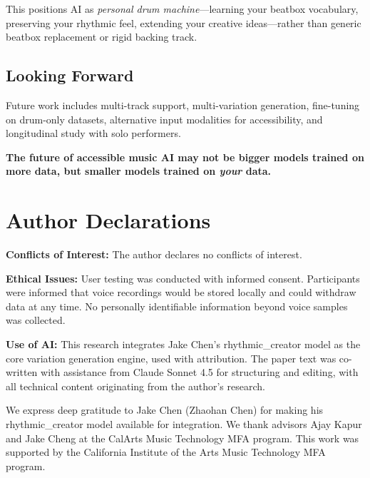 \documentclass{aimc2026}
\begin{document}
This positions AI as \emph{personal drum machine}---learning your beatbox vocabulary, preserving your rhythmic feel, extending your creative ideas---rather than generic beatbox replacement or rigid backing track.

\subsection{Looking Forward}

Future work includes multi-track support, multi-variation generation, fine-tuning on drum-only datasets, alternative input modalities for accessibility, and longitudinal study with solo performers.

\textbf{The future of accessible music AI may not be bigger models trained on more data, but smaller models trained on \emph{your} data.}


\section*{Author Declarations}

\textbf{Conflicts of Interest:} The author declares no conflicts of interest.

\textbf{Ethical Issues:} User testing was conducted with informed consent. Participants were informed that voice recordings would be stored locally and could withdraw data at any time. No personally identifiable information beyond voice samples was collected.

\textbf{Use of AI:} This research integrates Jake Chen's rhythmic\_creator model as the core variation generation engine, used with attribution. The paper text was co-written with assistance from Claude Sonnet 4.5 for structuring and editing, with all technical content originating from the author's research.

\begin{ack}
We express deep gratitude to Jake Chen (Zhaohan Chen) for making his rhythmic\_creator model available for integration. We thank advisors Ajay Kapur and Jake Cheng at the CalArts Music Technology MFA program. This work was supported by the California Institute of the Arts Music Technology MFA program.
\end{ack}




\end{document}
